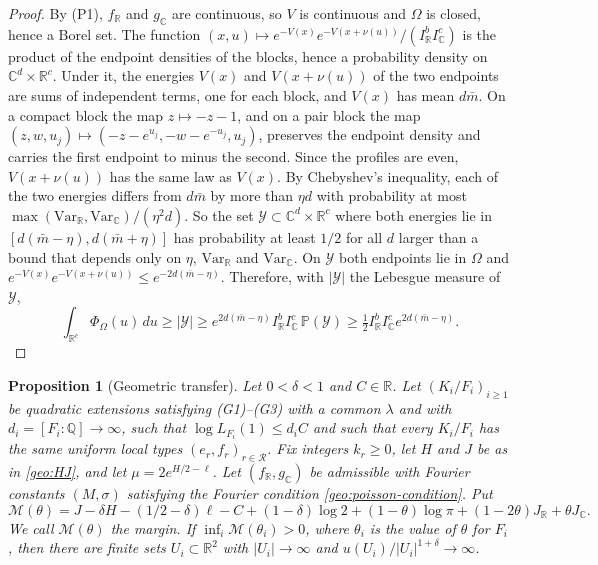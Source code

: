 \documentclass[11pt]{amsart}
\numberwithin{equation}{section}
\newtheorem{proposition}[equation]{Proposition}
\theoremstyle{definition}
\theoremstyle{remark}
\newcommand{\Q}{\mathbb Q}
\newcommand{\R}{\mathbb R}
\newcommand{\C}{\mathbb C}
\begin{document}
\begin{proof}
By (P1), $f_\R$ and $g_\C$ are continuous, so $V$ is continuous and
$\Omega$ is closed, hence a Borel set. The function
$(x,u)\mapsto e^{-V(x)}e^{-V(x+\nu(u))}/(I_\R^bI_\C^c)$ is the
product of the endpoint densities of the blocks, hence a probability
density on $\C^d\times\R^c$. Under it, the energies $V(x)$ and
$V(x+\nu(u))$ of the two endpoints are sums of independent terms, one for
each block, and $V(x)$ has mean $d\bar m$. On a compact block the map
$z\mapsto-z-1$, and on a pair block the map
$(z,w,u_j)\mapsto(-z-e^{u_j},-w-e^{-u_j},u_j)$, preserves the endpoint
density and carries the first endpoint to minus the second. Since the
profiles are even, $V(x+\nu(u))$ has the same law as $V(x)$. By
Chebyshev's inequality, each of the two energies differs from $d\bar m$
by more than $\eta d$ with probability at most
$\max(\mathrm{Var}_\R,\mathrm{Var}_\C)/(\eta^2d)$. So the set
$\mathcal Y\subset\C^d\times\R^c$ where both energies lie in
$[d(\bar m-\eta),d(\bar m+\eta)]$ has probability at least $1/2$ for all
$d$ larger than a bound that depends only on $\eta$, $\mathrm{Var}_\R$ and
$\mathrm{Var}_\C$. On $\mathcal Y$ both endpoints lie in $\Omega$ and
$e^{-V(x)}e^{-V(x+\nu(u))}\le e^{-2d(\bar m-\eta)}$. Therefore, with
$|\mathcal Y|$ the Lebesgue measure of $\mathcal Y$,
\[
 \int_{\R^c}\Phi_\Omega(u)\,du\ge|\mathcal Y|
 \ge e^{2d(\bar m-\eta)}I_\R^bI_\C^c\,\mathbb P(\mathcal Y)
 \ge\tfrac12I_\R^bI_\C^ce^{2d(\bar m-\eta)}.
\]
\end{proof}

\begin{proposition}[Geometric transfer]\label{geo:transfer}
Let $0<\delta<1$ and $C\in\R$. Let $(K_i/F_i)_{i\ge1}$ be quadratic
extensions satisfying (G1)--(G3) with a common $\lambda$ and with
$d_i=[F_i:\Q]\to\infty$, such that $\log L_{F_i}(1)\le d_iC$ and such
that every $K_i/F_i$ has the same uniform local types
$(e_r,f_r)_{r\in\mathcal R}$. Fix integers $k_r\ge0$, let $H$ and $J$ be
as in \eqref{geo:HJ}, and let $\mu=2e^{H/2-\ell}$. Let $(f_\R,g_\C)$ be
admissible with Fourier constants $(M,\sigma)$ satisfying the Fourier
condition \eqref{geo:poisson-condition}. Put
\begin{equation}\label{geo:general-margin}
 \mathcal M(\theta)=J-\delta H-(1/2-\delta)\ell-C
 +(1-\delta)\log2+(1-\theta)\log\pi
 +(1-2\theta)J_\R+\theta J_\C.
\end{equation}
We call $\mathcal M(\theta)$ the \emph{margin}. If
$\inf_i\mathcal M(\theta_i)>0$, where $\theta_i$ is the value of
$\theta$ for $F_i$, then there are finite sets $U_i\subset\R^2$ with
$|U_i|\to\infty$ and $u(U_i)/|U_i|^{1+\delta}\to\infty$.
\end{proposition}
\end{document}
